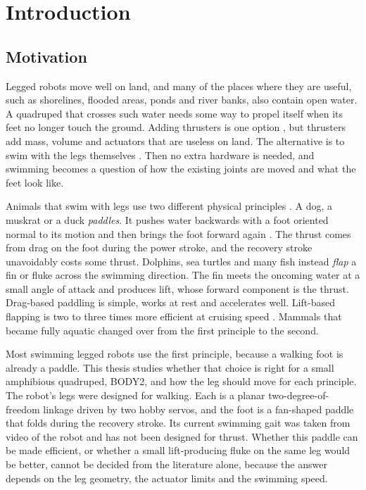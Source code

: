 \chapter{Introduction}
\label{ch:intro}

\section{Motivation}

Legged robots move well on land, and many of the places where they are useful, such as shorelines, flooded
areas, ponds and river banks, also contain open water. A quadruped that crosses such water needs some way to
propel itself when its feet no longer touch the ground. Adding thrusters is one option \cite{Yao2023}, but
thrusters add mass, volume and actuators that are useless on land. The alternative is to swim with the legs
themselves \cite{Li2019,Qu2025,Han2025,Wang2025}. Then no extra hardware is needed, and swimming becomes a
question of how the existing joints are moved and what the feet look like.

Animals that swim with legs use two different physical principles \cite{Fish1996}. A dog, a muskrat or a duck
\emph{paddles}. It pushes water backwards with a foot oriented normal to its motion and then brings the foot
forward again \cite{Fish1984,Fish2021DogPaddle}. The thrust comes from drag on the foot during the power
stroke, and the recovery stroke unavoidably costs some thrust. Dolphins, sea turtles and many fish instead
\emph{flap} a fin or fluke across the swimming direction. The fin meets the oncoming water at a small angle of
attack and produces lift, whose forward component is the thrust. Drag-based paddling is simple, works at rest
and accelerates well. Lift-based flapping is two to three times more efficient at cruising speed
\cite{Fish1996,Walker2000}. Mammals that became fully aquatic changed over from the first principle to the
second.

Most swimming legged robots use the first principle, because a walking foot is already a paddle. This thesis
studies whether that choice is right for a small amphibious quadruped, BODY2, and how the leg should move for
each principle. The robot's legs were designed for walking. Each is a planar two-degree-of-freedom linkage
driven by two hobby servos, and the foot is a fan-shaped paddle that folds during the recovery stroke. Its
current swimming gait was taken from video of the robot and has not been designed for thrust. Whether this
paddle can be made efficient, or whether a small lift-producing fluke on the same leg would be better, cannot
be decided from the literature alone, because the answer depends on the leg geometry, the actuator limits and
the swimming speed.

